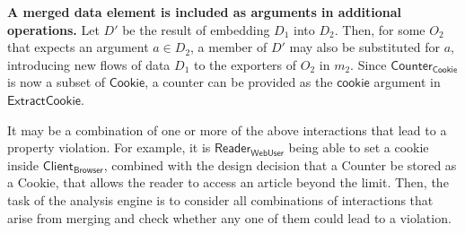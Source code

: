 \textbf{A merged data element is included as arguments in additional
  operations.}  Let $D'$ be the result of embedding $D_1$ into
$D_2$. Then, for some $O_2$ that expects an argument $a \in D_2$, a
member of $D'$ may also be substituted for $a$, introducing new flows
of data $D_1$ to the exporters of $O_2$ in $m_2$. Since
$\textsf{Counter}_\textsf{Cookie}$ is now a subset of
$\textsf{Cookie}$, a counter can be provided as the $\textsf{cookie}$
argument in $\textsf{ExtractCookie}$.

It may be a combination of one or more of the above interactions that
lead to a property violation. For example, it is
$\textsf{Reader}_\textsf{WebUser}$ being able to set a cookie inside
$\textsf{Client}_\textsf{Browser}$, combined with the design decision
that a \textsf{Counter} be stored as a \textsf{Cookie}, that allows
the reader to access an article beyond the limit. Then, the task of
the analysis engine is to consider all combinations of interactions
that arise from merging and check whether any one of them could lead
to a violation.



